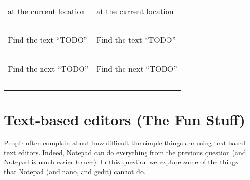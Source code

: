 \documentclass{article}
\begin{document}
\begin{tabularx}{\textwidth}{X|X}
  at the current location           & at the current location            \\
                                    &                                    \\
                                    &                                    \\
                                    &                                    \\
                                    &                                    \\
                                    &                                    \\
  Find the text ``TODO''            & Find the text ``TODO''             \\
                                    &                                    \\
                                    &                                    \\
                                    &                                    \\
                                    &                                    \\
                                    &                                    \\
  Find the next ``TODO''            & Find the next ``TODO''             \\
                                    &                                    \\
                                    &                                    \\
                                    &                                    \\
                                    &                                    \\
                                    &                                    \\
\end{tabularx}



\newpage
\section{Text-based editors (The Fun Stuff)}

People often complain about how difficult the simple things are using
text-based text editors. Indeed, Notepad can do everything from the previous
question (and Notepad is much easier to use). In this question we explore some
of the things that Notepad (and nano, and gedit) cannot do.
\end{document}
